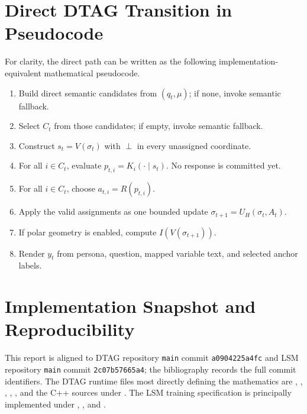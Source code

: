 \documentclass[journal]{IEEEtran}
\newcommand{\botv}{\perp}
\newcommand{\1}{\mathbf{1}}
\begin{document}
\section{Direct DTAG Transition in Pseudocode}
\label{app:pseudocode}

For clarity, the direct path can be written as the following implementation-equivalent mathematical pseudocode.
\begin{enumerate}[leftmargin=1.5em]
\item Build direct semantic candidates from $(q_t,\mu)$; if none, invoke semantic fallback.
\item Select $C_t$ from those candidates; if empty, invoke semantic fallback.
\item Construct $s_t=V(\sigma_t)$ with $\botv$ in every unassigned coordinate.
\item For all $i\in C_t$, evaluate $p_{t,i}=K_i(\cdot\mid s_t)$. No response is committed yet.
\item For all $i\in C_t$, choose $a_{t,i}=R(p_{t,i})$.
\item Apply the valid assignments as one bounded update $\sigma_{t+1}=U_H(\sigma_t,A_t)$.
\item If polar geometry is enabled, compute $I(V(\sigma_{t+1}))$.
\item Render $y_t$ from persona, question, mapped variable text, and selected anchor labels.
\end{enumerate}

\section{Implementation Snapshot and Reproducibility}
\label{app:snapshot}

This report is aligned to DTAG repository \texttt{main} commit \texttt{a0904225a4fc} and LSM repository \texttt{main} commit \texttt{2c07b57665a4}; the bibliography records the full commit identifiers. The DTAG runtime files most directly defining the mathematics are , , , , , and the C++ sources under . The LSM training specification is principally implemented under , , and  \cite{dtag2026,lsm2026}.



\end{document}
